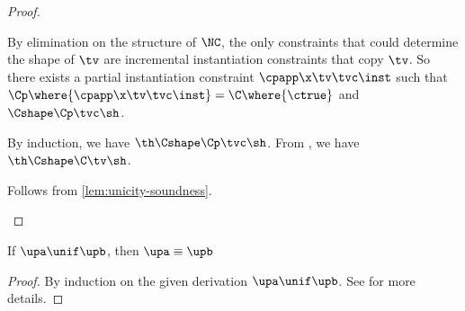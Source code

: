 \documentclass[acmsmall,screen,nonacm%
\Anonymous{,anonymous}{}%
\Final{}{,review}%
]{acmart}
\newcommand{\BBemlti}{Pottier-Remy/emlti} %
\providecommand{\DIFaddbegin}{} %
\providecommand{\DIFaddend}{} %
\providecommand{\DIFdelbegin}{} %
\providecommand{\DIFdelend}{} %
\begin{document}
\begin{lemma}
\begin{proof}
\begin{proofcases}
\begin{proofcases}
            By elimination on the structure of $\NC$, the only constraints that
            could determine the shape of $\tv$ are incremental instantiation
            constraints that copy $\tv$. So there exists a partial
            instantiation constraint $\cpapp \x \tv \tvc \inst$ such that $\Cp
            \where{\cpapp \x \tv \tvc \inst} = \C\where{\ctrue}$ and $\Cshape
            \Cp \tvc \sh$.

            By induction, we have $\th \Cshape \Cp \tvc \sh$. From
            , we have $\th \Cshape \C \tv \sh$.


        \end{proofcases}

      \proofcase{$\impliedby$} Follows from \cref{lem:unicity-soundness}.

    \end{proofcases}

  \end{proof}
\end{lemma}

\begin{lemma}
  \label{lem:unification-preservation}
  If $\upa \unif \upb$, then $\upa \equiv \upb$
  \begin{proof}
    By induction on the given derivation $\upa \unif \upb$.
    See \DIFdelbegin %
\DIFdelend \DIFaddbegin \citet*{\BBemlti} \DIFaddend for more details.
  \end{proof}
\end{lemma}
\end{document}
